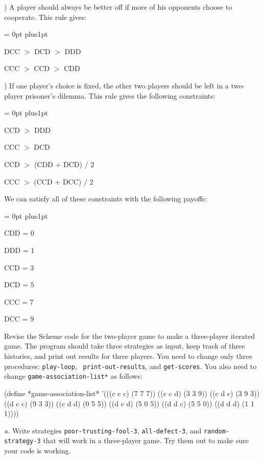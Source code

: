 ) A player should always be better off if more of his
opponents choose to cooperate. This rule gives:

{\narrower \narrower
{\parskip = 0pt plus1pt

	DCC $>$ DCD $>$ DDD

	CCC $>$ CCD $>$ CDD

}}

) If one player's choice is fixed, the other two players should be
left in a two-player prisoner's dilemma. This rule gives the following
constraints: 

{\narrower \narrower
{\parskip = 0pt plus1pt

	CCD $>$ DDD

	CCC $>$ DCD

	CCD $>$ (CDD + DCD) / 2

	CCC $>$ (CCD + DCC) / 2

}}

\noindent We can satisfy all of these constraints with the following payoffs:

{\narrower \narrower
{\parskip = 0pt plus1pt

	CDD = 0

	DDD = 1

	CCD = 3

	DCD = 5

	CCC = 7

	DCC = 9

}}


\vskip 4pt


Revise the Scheme code for the two-player game to make a three-player
iterated game. The program should take three strategies as input, keep
track of three histories, and print out results for three players. You
need to change only three procedures: {\tt play-loop}, {\tt
print-out-results}, and {\tt get-scores}. You also need to change
{\tt *game-association-list*} as follows:

\beginlisp
(define *game-association-list*
  '(((c c c) (7 7 7))
    ((c c d) (3 3 9))
    ((c d c) (3 9 3))
    ((d c c) (9 3 3))
    ((c d d) (0 5 5))
    ((d c d) (5 0 5))
    ((d d c) (5 5 0))
    ((d d d) (1 1 1))))
\endlisp

\vskip 4pt


{\it a.} Write strategies {\tt poor-trusting-fool-3}, {\tt all-defect-3}, and
{\tt random-strategy-3} that will work in a three-player game. Try
them out to make sure your code is working.

